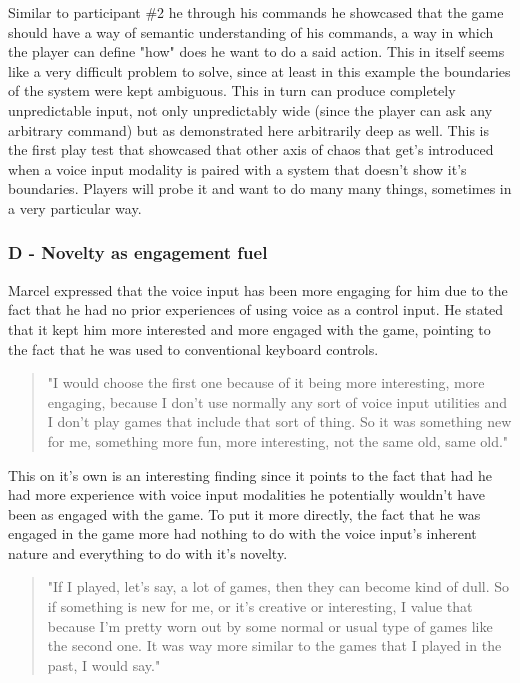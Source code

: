 Similar to participant \#2 he through his commands he showcased that the game should have a way of semantic understanding of his commands, a way in which the player can define "how" does he want to do a said action. This in itself seems like a very difficult problem to solve, since at least in this example the boundaries of the system were kept ambiguous. This in turn can produce completely unpredictable input, not only unpredictably wide (since the player can ask any arbitrary command) but as demonstrated here arbitrarily deep as well. This is the first play test that showcased that other axis of chaos that get's introduced when a voice input modality is paired with a system that doesn't show it's boundaries. Players will probe it and want to do many many things, sometimes in a very particular way.




\subsubsection{D - Novelty as engagement fuel}

Marcel expressed that the voice input has been more engaging for him due to the fact that he had no prior experiences of using voice as a control input. He stated that it kept him more interested and more engaged with the game, pointing to the fact that he was used to conventional keyboard controls. 

\begin{quote}
    "I would choose the first one because of it being more interesting, more engaging, because I don't use normally any sort of voice input utilities and I don't play games that include that sort of thing. So it was something new for me, something more fun, more interesting, not the same old, same old."
\end{quote}

This on it's own is an interesting finding since it points to the fact that had he had more experience with voice input modalities he potentially wouldn't have been as engaged with the game. To put it more directly, the fact that he was engaged in the game more had nothing to do with the voice input's inherent nature and everything to do with it's novelty. 

\begin{quote}
    "If I played, let's say, a lot of games, then they can become kind of dull. So if something is new for me, or it's creative or interesting, I value that because I'm pretty worn out by some normal or usual type of games like the second one. It was way more similar to the games that I played in the past, I would say."
\end{quote}


